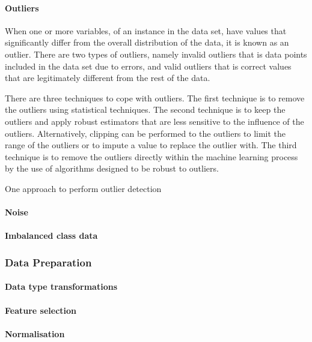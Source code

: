 \documentclass[10pt, conference]{IEEEtran}
\begin{document}
\paragraph{Outliers}

When one or more variables, of an instance in the data set, have values that significantly differ from the overall distribution
of the data, it is known as an outlier. There are two types of outliers, namely invalid outliers that is data points included
in the data set due to errors, and valid outliers that is correct values that are legitimately different from the rest
of the data.

There are three techniques to cope with outliers. The first technique is to remove the outliers using statistical
techniques. The second technique is to keep the outliers and apply robust estimators that are less sensitive to the
influence of the outliers. Alternatively, clipping can be performed to the outliers to limit the range of the outliers
or to impute a value to replace the outlier with. The third technique is to remove the outliers directly within the
machine learning process by the use of algorithms designed to be robust to outliers.

One approach to perform outlier detection 

\paragraph{Noise}

\paragraph{Imbalanced class data}

\subsubsection{Data Preparation}

\paragraph{Data type transformations}

\paragraph{Feature selection}

\paragraph{Normalisation}
\end{document}
